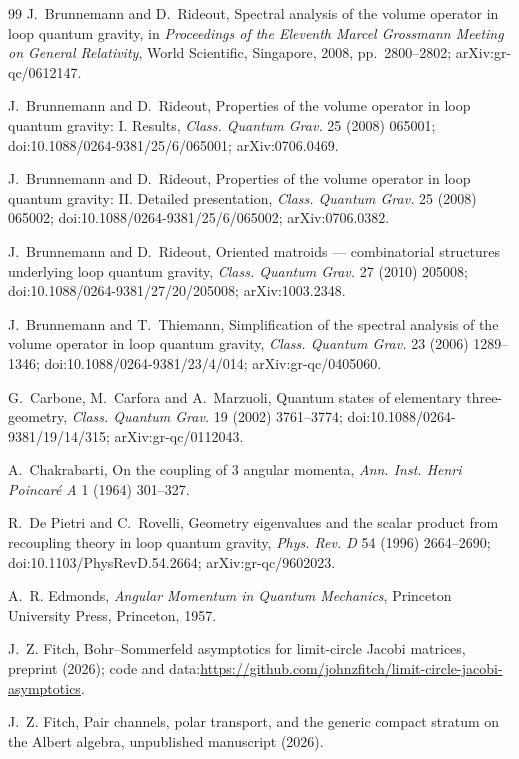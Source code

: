 \begin{thebibliography}{99}
J.~Brunnemann and D.~Rideout, Spectral analysis of the volume operator in loop quantum
gravity, in \emph{Proceedings of the Eleventh Marcel Grossmann Meeting on General
Relativity}, World Scientific, Singapore, 2008, pp.~2800--2802; arXiv:gr-qc/0612147.

J.~Brunnemann and D.~Rideout, Properties of the volume operator in loop quantum gravity: I.
Results, \emph{Class. Quantum Grav.} 25 (2008) 065001; doi:10.1088/0264-9381/25/6/065001;
arXiv:0706.0469.

J.~Brunnemann and D.~Rideout, Properties of the volume operator in loop quantum gravity: II.
Detailed presentation, \emph{Class. Quantum Grav.} 25 (2008) 065002;
doi:10.1088/0264-9381/25/6/065002; arXiv:0706.0382.

J.~Brunnemann and D.~Rideout, Oriented matroids --- combinatorial structures underlying loop
quantum gravity, \emph{Class. Quantum Grav.} 27 (2010) 205008;
doi:10.1088/0264-9381/27/20/205008; arXiv:1003.2348.

J.~Brunnemann and T.~Thiemann, Simplification of the spectral analysis of the volume operator
in loop quantum gravity, \emph{Class. Quantum Grav.} 23 (2006) 1289--1346;
doi:10.1088/0264-9381/23/4/014; arXiv:gr-qc/0405060.

G.~Carbone, M.~Carfora and A.~Marzuoli, Quantum states of elementary three-geometry,
\emph{Class. Quantum Grav.} 19 (2002) 3761--3774; doi:10.1088/0264-9381/19/14/315;
arXiv:gr-qc/0112043.

A.~Chakrabarti, On the coupling of 3 angular momenta, \emph{Ann. Inst. Henri Poincar\'e A} 1
(1964) 301--327.

R.~De Pietri and C.~Rovelli, Geometry eigenvalues and the scalar product from recoupling
theory in loop quantum gravity, \emph{Phys. Rev. D} 54 (1996) 2664--2690;
doi:10.1103/PhysRevD.54.2664; arXiv:gr-qc/9602023.

A.~R. Edmonds, \emph{Angular Momentum in Quantum Mechanics}, Princeton University Press,
Princeton, 1957.

J.~Z. Fitch, Bohr--Sommerfeld asymptotics for limit-circle Jacobi matrices, preprint (2026);
code and data:\newline\url{https://github.com/johnzfitch/limit-circle-jacobi-asymptotics}.

J.~Z. Fitch, Pair channels, polar transport, and the generic compact stratum on the Albert
algebra, unpublished manuscript (2026).


\end{thebibliography}
